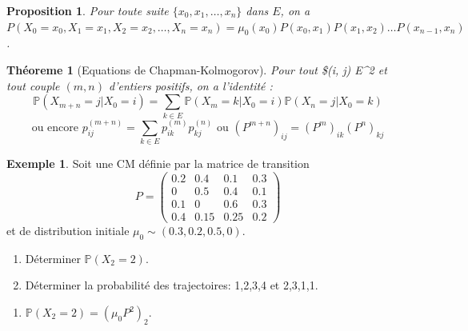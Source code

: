 \documentclass[
]{book}
\providecommand{\tightlist}{%
  \setlength{\itemsep}{0pt}\setlength{\parskip}{0pt}}
\newtheorem{theorem}{Théoreme}[chapter]
\newtheorem{proposition}{Proposition}[chapter]
\theoremstyle{definition}
\theoremstyle{definition}
\newtheorem{example}{Exemple}[chapter]
\theoremstyle{definition}
\theoremstyle{remark}
\begin{document}
\begin{proposition}
\protect\hypertarget{prp:unnamed-chunk-50}{}{\label{prp:unnamed-chunk-50} }Pour toute suite \(\{x_0, x_1, \ldots , x_n\}\) dans \(E\), on a
\(P(X_0 = x_0, X_1 = x_1,X_2 = x_2, \ldots , X_n = x_n) =\mu_0(x_0)P(x_0, x_1)P(x_1, x_2)\ldots P(x_{n−1}, x_n)\).
\end{proposition}

\begin{theorem}[Equations de Chapman-Kolmogorov]
\protect\hypertarget{thm:unnamed-chunk-51}{}{\label{thm:unnamed-chunk-51} {} }Pour tout \$(i, j) \in E\^{}2 et tout couple \((m, n)\) d'entiers positifs, on a l'identité :
\[
\mathbb{P}(X_{m+n} = j|X_0 = i) = \sum_{k\in E}
\mathbb{P}(X_m = k|X_0 = i)\mathbb{P}(X_n = j|X_0 = k)\]
\[\text{ou encore }
p^{(m+n)}_{ij} = \sum_{k \in E} p^{(m)}_{ik} p^{(n)}_{kj} \text{ ou } (P^{m+n})_{ij}=(P^m)_{ik}(P^n)_{kj}\]
\end{theorem}

\begin{example}
\protect\hypertarget{exm:unnamed-chunk-52}{}{\label{exm:unnamed-chunk-52} }Soit une CM définie par la matrice de transition \[
  P=\left( 
  \begin{array}{cccc}
  0.2 & 0.4 & 0.1 & 0.3\\
  0 & 0.5 & 0.4 & 0.1\\
  0.1 & 0 & 0.6 & 0.3\\
  0.4 & 0.15 & 0.25 & 0.2
  \end{array}
    \right)
  \]
et de distribution initiale \(\mu_0 \sim (0.3,0.2,0.5,0)\).

\begin{enumerate}
\def\labelenumi{\arabic{enumi}.}
\tightlist
\item
  Déterminer \(\mathbb{P}(X_2=2)\).
\item
  Déterminer la probabilité des trajectoires: 1,2,3,4 et 2,3,1,1.
\end{enumerate}
\end{example}

\begin{enumerate}
\def\labelenumi{\arabic{enumi}.}
\tightlist
\item
  \(\mathbb{P}(X_2=2)=\left(\mu_0 P^2 \right)_{2}\).
\end{enumerate}
\end{document}
